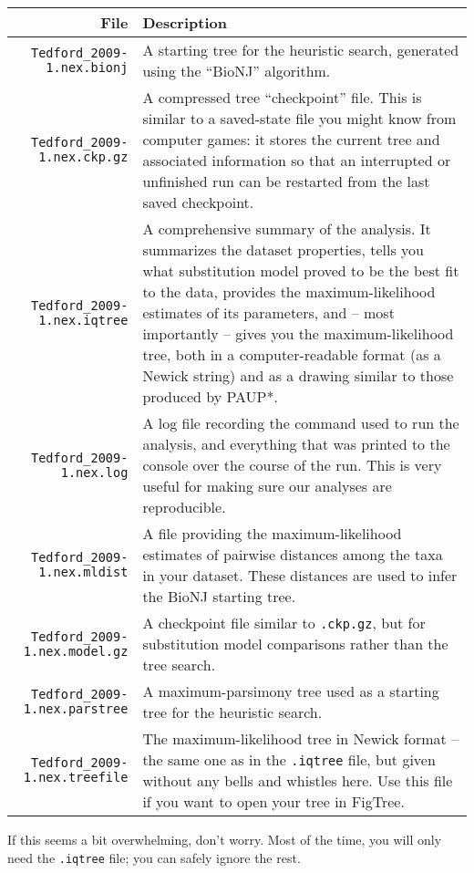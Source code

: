 \documentclass[12pt]{article}
\begin{document}
\begin{longtable}{r p{9.5cm}}
\toprule
\textbf{File} & \textbf{Description} \\
\midrule
\texttt{Tedford\_2009-1.nex.bionj} & A starting tree for the heuristic search, generated using the ``BioNJ'' algorithm. \\
\texttt{Tedford\_2009-1.nex.ckp.gz} & A compressed tree ``checkpoint'' file. This is similar to a saved-state file you might know from computer games: it stores the current tree and associated information so that an interrupted or unfinished run can be restarted from the last saved checkpoint. \\
\texttt{Tedford\_2009-1.nex.iqtree} & A comprehensive summary of the analysis. It summarizes the dataset properties, tells you what substitution model proved to be the best fit to the data, provides the maximum-likelihood estimates of its parameters, and -- most importantly -- gives you the maximum-likelihood tree, both in a computer-readable format (as a Newick string) and as a drawing similar to those produced by PAUP*. \\
\texttt{Tedford\_2009-1.nex.log} & A log file recording the command used to run the analysis, and everything that was printed to the console over the course of the run. This is very useful for making sure our analyses are reproducible. \\
\texttt{Tedford\_2009-1.nex.mldist} & A file providing the maximum-likelihood estimates of pairwise distances among the taxa in your dataset. These distances are used to infer the BioNJ starting tree. \\
\texttt{Tedford\_2009-1.nex.model.gz} & A checkpoint file similar to \texttt{.ckp.gz}, but for substitution model comparisons rather than the tree search. \\
\texttt{Tedford\_2009-1.nex.parstree} & A maximum-parsimony tree used as a starting tree for the heuristic search. \\
\texttt{Tedford\_2009-1.nex.treefile} & The maximum-likelihood tree in Newick format -- the same one as in the \texttt{.iqtree} file, but given without any bells and whistles here. Use this file if you want to open your tree in FigTree. \\
\bottomrule
\end{longtable}

\noindent If this seems a bit overwhelming, don't worry. Most of the time, you will only need the \texttt{.iqtree} file; you can safely ignore the rest.
\end{document}
